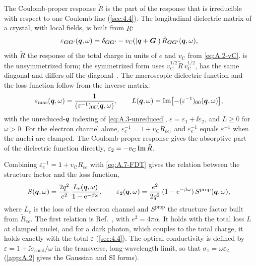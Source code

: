 The Coulomb-proper response $\tilde R$ is the part of the response that is irreducible with respect to one Coulomb line (\cref{sec:4.4}). The longitudinal dielectric matrix of a crystal, with local fields, is built from $\tilde R$:
\begin{equation}
  \varepsilon_{\bm{G}\bm{G}'}(\bm{q},\omega) = \delta_{\bm{G}\bm{G}'} - v_{\mathrm{C}}(|\bm{q}+\bm{G}|)\,\tilde R_{\bm{G}\bm{G}'}(\bm{q},\omega),
  \label{eq:A.7-eps}
\end{equation}
with $\tilde R$ the response of the total charge in units of $e$ and $v_{\mathrm{C}}$ from \cref{eq:A.2-vC}.  is the unsymmetrized form; the symmetrized form uses $v_{\mathrm{C}}^{1/2}\tilde R\,v_{\mathrm{C}}^{1/2}$, has the same diagonal and differs off the diagonal~\cite[footnote~3]{knapen2021dark}. The macroscopic dielectric function and the loss function follow from the inverse matrix:
\begin{equation}
  \varepsilon_{\mathrm{mac}}(\bm{q},\omega) = \frac{1}{(\varepsilon^{-1})_{00}(\bm{q},\omega)}, \qquad
  L(\bm{q},\omega) = \operatorname{Im}\bigl[-(\varepsilon^{-1})_{00}(\bm{q},\omega)\bigr],
  \label{eq:A.7-L}
\end{equation}
with the unreduced-$\bm{q}$ indexing of \cref{eq:A.3-unreduced}, $\varepsilon = \varepsilon_1 + \ii\varepsilon_2$, and $L \ge 0$ for $\omega > 0$. For the electron channel alone, $\varepsilon_e^{-1} = 1 + v_{\mathrm{C}} R_{ee}$, and $\varepsilon_e^{-1}$ equals $\varepsilon^{-1}$ when the nuclei are clamped. The Coulomb-proper response gives the absorptive part of the dielectric function directly, $\varepsilon_2 = -v_{\mathrm{C}}\operatorname{Im}\tilde R$.

Combining $\varepsilon_e^{-1} = 1 + v_{\mathrm{C}} R_{ee}$ with \cref{eq:A.7-FDT} gives the relation between the structure factor and the loss function,
\begin{equation}
  S(\bm{q},\omega) = \frac{2q^2}{e^2}\,\frac{L_e(\bm{q},\omega)}{1 - \mathrm{e}^{-\beta\omega}}, \qquad
  \varepsilon_2(\bm{q},\omega) = \frac{e^2}{2q^2}\,(1 - \mathrm{e}^{-\beta\omega})\,S^{\mathrm{prop}}(\bm{q},\omega),
  \label{eq:A.7-SL}
\end{equation}
where $L_e$ is the loss of the electron channel and $S^{\mathrm{prop}}$ the structure factor built from $\tilde R_{ee}$. The first relation is Ref.~\cite[Eq.~(6)]{knapen2021dark}, with $e^2 = 4\pi\alpha$. It holds with the total loss $L$ at clamped nuclei, and for a dark photon, which couples to the total charge, it holds exactly with the total $\varepsilon$ (\cref{sec:4.4}). The optical conductivity is defined by $\varepsilon = 1 + \ii\sigma_{\mathrm{cond}}/\omega$ in the transverse, long-wavelength limit, so that $\sigma_1 = \omega\varepsilon_2$ (\cref{app:A.2} gives the Gaussian and SI forms).

